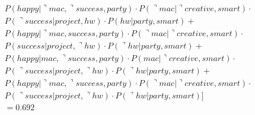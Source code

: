 \documentclass[letterpaper, 12pt]{artikel3}
\begin{document}
\begin{align*}
& P(happy |\urcorner mac,\urcorner success, party) \cdot P(\urcorner mac| \urcorner creative, smart) \cdot \\
& P(\urcorner success | project, hw) \cdot P(hw| party, smart) +\\
& P(happy |\urcorner mac, success, party) \cdot P(\urcorner mac| \urcorner creative, smart) \cdot \\
& P(success | project,\urcorner hw) \cdot P(\urcorner hw| party, smart) +\\
& P(happy |mac,\urcorner success, party) \cdot P(mac| \urcorner creative, smart) \cdot \\
& P(\urcorner success | project,\urcorner hw) \cdot P(\urcorner hw| party, smart) +\\
& P(happy |\urcorner mac, \urcorner success, party) \cdot P(\urcorner mac| \urcorner creative, smart) \cdot \\
& P(\urcorner success | project, \urcorner hw) \cdot P(\urcorner hw| party, smart) ]\\
& = 0.692
\end{align*}
\end{document}
